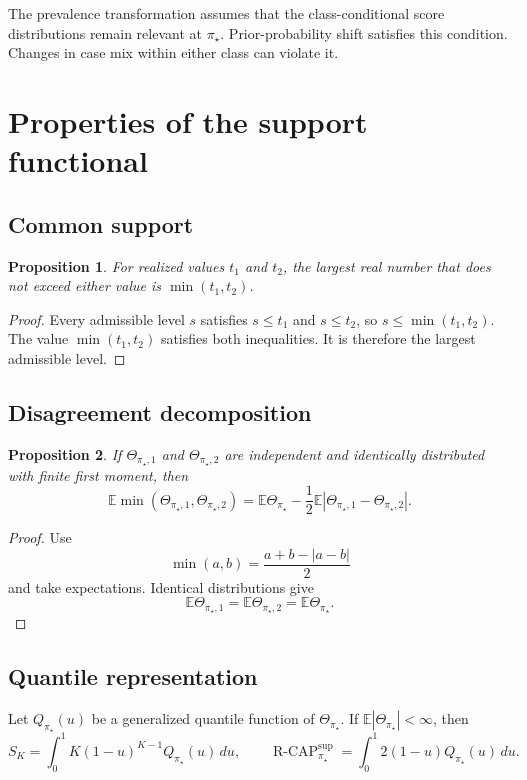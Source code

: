 \documentclass[11pt]{article}
\newcommand{\E}{\mathbb{E}}
\newcommand{\RCAP}{\operatorname{R\text{-}CAP}^{\mathrm{sup}}_{\pi_\star}}
\newtheorem{proposition}{Proposition}
\theoremstyle{remark}
\begin{document}
The prevalence transformation assumes that the class-conditional score distributions remain relevant at $\pi_\star$. Prior-probability shift satisfies this condition. Changes in case mix within either class can violate it.

\section{Properties of the support functional}
\label{app:properties}

\subsection{Common support}

\begin{proposition}
For realized values $t_1$ and $t_2$, the largest real number that does not exceed either value is $\min(t_1,t_2)$.
\end{proposition}

\begin{proof}
Every admissible level $s$ satisfies $s\leq t_1$ and $s\leq t_2$, so $s\leq\min(t_1,t_2)$. The value $\min(t_1,t_2)$ satisfies both inequalities. It is therefore the largest admissible level.
\end{proof}

\subsection{Disagreement decomposition}

\begin{proposition}
If $\Theta_{\pi_\star,1}$ and $\Theta_{\pi_\star,2}$ are independent and identically distributed with finite first moment, then
\[
\E\min(\Theta_{\pi_\star,1},\Theta_{\pi_\star,2})
=
\E\Theta_{\pi_\star}
-
\frac12
\E|\Theta_{\pi_\star,1}-\Theta_{\pi_\star,2}|.
\]
\end{proposition}

\begin{proof}
Use
\[
\min(a,b)=\frac{a+b-|a-b|}{2}
\]
and take expectations. Identical distributions give
\[
\E\Theta_{\pi_\star,1}
=
\E\Theta_{\pi_\star,2}
=
\E\Theta_{\pi_\star}.
\]
\end{proof}

\subsection{Quantile representation}

Let $Q_{\pi_\star}(u)$ be a generalized quantile function of $\Theta_{\pi_\star}$. If $\E|\Theta_{\pi_\star}|<\infty$, then
\begin{equation}
S_K
=
\int_0^1 K(1-u)^{K-1}Q_{\pi_\star}(u)\,du,
\qquad
\RCAP
=
\int_0^1 2(1-u)Q_{\pi_\star}(u)\,du.
\label{eq:quantile}
\end{equation}
\end{document}
